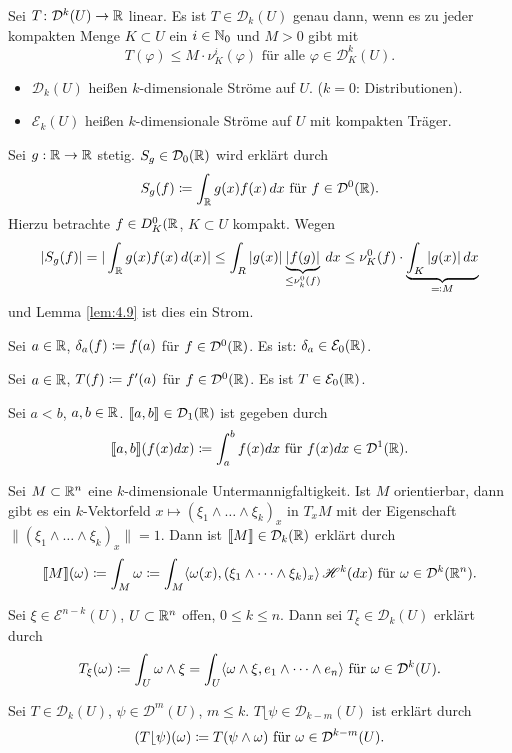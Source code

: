 \documentclass[a4paper,twoside,DIV15,BCOR12mm]{scrbook}
\newcommand{\HM}{\mathscr H}
\newcommand{\MR}{\lfloor}
\begin{document}
\begin{lemma}
\label{lem:4.9}
Sei $T\colon \mathcal D^k(U) \to\mathbb{R}$ linear. Es ist $T\in \mathcal D_k(U)$ genau dann, wenn es zu jeder kompakten Menge $K\subset U$ ein $i\in\mathbb{N}_0$ und $M>0$ gibt mit
\[
T(\varphi) \le M\cdot \nu_K^i(\varphi)  \text{ für alle } \varphi \in \mathcal D_K^k(U).
\]
\end{lemma}

\begin{definition}
\begin{itemize}
\item $\mathcal D_k(U)$ heißen $k$-dimensionale Ströme auf $U$. ($k=0$: Distributionen).
\item $\mathcal E_k(U)$ heißen $k$-dimensionale Ströme auf $U$ mit kompakten Träger.
\end{itemize}
\end{definition}

\begin{beispiele}
\item Sei $g:\mathbb{R}\to \mathbb{R}$ stetig. $S_g \in \mathcal D_0(\mathbb{R})$ wird erklärt durch
\[
S_g(f) \da \int_\MdR g(x)f(x)\, dx\text{ für } f\in \mathcal D^0(\MdR).
\]
Hierzu betrachte $f\in D_K^0(\mathbb{R}$, $K\subset U$ kompakt. Wegen
\[
|S_g(f)| = |\int_\MdR g(x) f(x) \, d(x)| \le \int_R |g(x)|\underbrace{|f(g)|}_{\le \nu_k^0(f)} \, dx \le \nu_K^0(f) \cdot \underbrace{\int_K |g(x)|\, dx}_{\ad M}\]
und Lemma \ref{lem:4.9} ist dies ein Strom.
\item Sei $a\in\mathbb{R}$, $\delta_a(f) \da f(a)$ für $f\in \mathcal D^0(\mathbb{R})$. Es ist: $\delta_a\in\mathcal E_0(\mathbb{R})$.
\item Sei $a\in\mathbb{R}$, $T(f) \da f'(a)$ für $f\in\mathcal D^0(\mathbb{R})$. Es ist $T\in \mathcal E_0(\mathbb{R})$.
\item Sei $a< b$, $a,b\in\mathbb{R}$. $\llbracket a,b\rrbracket \in \mathcal D_1(\mathbb{R})$ ist gegeben durch
\[
\llbracket a,b\rrbracket(f(x)dx) \da \int_a^b f(x) dx \text{ für } f(x)dx \in \mathcal D^1(\MdR).
\]
\item Sei $M\subset\mathbb{R}^n$ eine $k$-dimensionale Untermannigfaltigkeit. Ist $M$ orientierbar, dann gibt es ein $k$-Vektorfeld $x\mapsto (\xi_1\wedge\dots\wedge \xi_k)_x$ in $T_xM$ mit der Eigenschaft $\|(\xi_1\wedge\dots\wedge\xi_k)_x\|=1$. Dann ist $\llbracket M\rrbracket \in \mathcal D_k(\mathbb{R})$ erklärt durch
\[
\llbracket M \rrbracket(\omega) \da \int_M \omega \da \int_M \langle \omega(x), (\xi_1\wedge\dots\wedge \xi_k)_x\rangle \,\HM^k(dx) \text{ für } \omega \in \mathcal D^k(\MdR^n).
\]
\item Sei $\xi\in\mathcal E^{n-k}(U)$, $U\subset \mathbb{R}^n$ offen, $0\le k \le n$. Dann sei $T_\xi \in \mathcal D_k(U)$ erklärt durch
\[
T_\xi(\omega) \da \int_U \omega\wedge\xi = \int_U \langle \omega\wedge \xi, e_1\wedge\dots\wedge e_n\rangle  \text{ für }\omega \in \mathcal D^k(U).
\]
\item Sei $T\in \mathcal D_k(U)$, $\psi\in\mathcal D^m(U)$, $m\le k$. $T\MR \psi \in \mathcal D_{k-m}(U)$ ist erklärt durch
\[
(T\MR \psi)(\omega) \da T(\psi \wedge \omega) \text{ für } \omega \in \mathcal D^{k-m}(U).
\]
\end{beispiele}
\end{document}
